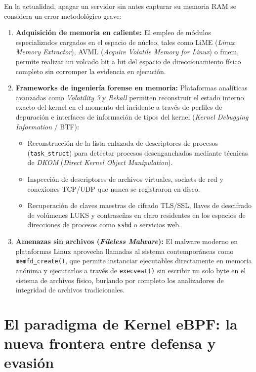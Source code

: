 En la actualidad, apagar un servidor sin antes capturar su memoria RAM se considera un error metodológico grave:
\begin{enumerate}
    \item \textbf{Adquisición de memoria en caliente:} El empleo de módulos especializados cargados en el espacio de núcleo, tales como LiME (\textit{Linux Memory Extractor}), AVML (\textit{Acquire Volatile Memory for Linux}) o fmem, permite realizar un volcado bit a bit del espacio de direccionamiento físico completo sin corromper la evidencia en ejecución.
    \item \textbf{Frameworks de ingeniería forense en memoria:} Plataformas analíticas avanzadas como \textit{Volatility 3} y \textit{Rekall} permiten reconstruir el estado interno exacto del kernel en el momento del incidente a través de perfiles de depuración e interfaces de información de tipos del kernel (\textit{Kernel Debugging Information} / BTF):
    \begin{itemize}
        \item Reconstrucción de la lista enlazada de descriptores de procesos (\texttt{task\_struct}) para detectar procesos desenganchados mediante técnicas de \textit{DKOM} (\textit{Direct Kernel Object Manipulation}).
        \item Inspección de descriptores de archivos virtuales, sockets de red y conexiones TCP/UDP que nunca se registraron en disco.
        \item Recuperación de claves maestras de cifrado TLS/SSL, llaves de descifrado de volúmenes LUKS y contraseñas en claro residentes en los espacios de direcciones de procesos como \texttt{sshd} o servicios web.
    \end{itemize}
    \item \textbf{Amenazas sin archivos (\textit{Fileless Malware}):} El malware moderno en plataformas Linux aprovecha llamadas al sistema contemporáneas como \texttt{memfd\_create()}, que permite instanciar ejecutables directamente en memoria anónima y ejecutarlos a través de \texttt{execveat()} sin escribir un solo byte en el sistema de archivos físico, burlando por completo los analizadores de integridad de archivos tradicionales.
\end{enumerate}

\section{El paradigma de Kernel eBPF: la nueva frontera entre defensa y evasión}

